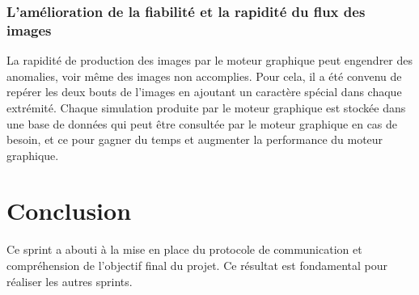 \subsubsection{L’amélioration de la fiabilité et la rapidité du flux des images }
La rapidité de production des images par le moteur graphique peut engendrer des anomalies, voir même des images non accomplies. Pour cela, il a été convenu de repérer les deux bouts de l’images en ajoutant un caractère spécial dans chaque extrémité.
Chaque simulation produite par le moteur graphique est stockée dans une base de données qui peut être consultée par le moteur graphique en cas de besoin, et ce pour gagner du temps et augmenter la performance du moteur graphique.


\section*{Conclusion}
Ce sprint a abouti à la mise en place du protocole de communication et compréhension de l’objectif final du projet. Ce résultat est fondamental pour réaliser les autres sprints.


